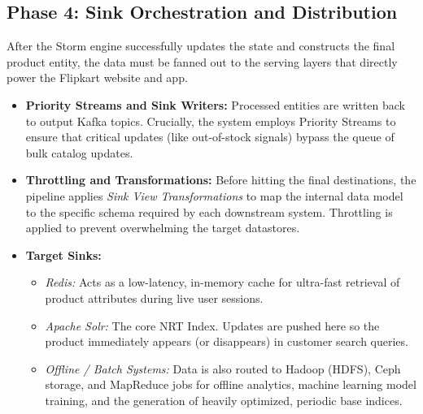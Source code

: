 \subsection{Phase 4: Sink Orchestration and Distribution}
\begin{justify}
    After the Storm engine successfully updates the state and constructs the final product entity, the data must be fanned out to the serving layers that directly power the Flipkart website and app.
    
    \begin{itemize}
        \item \textbf{Priority Streams and Sink Writers:} Processed entities are written back to output Kafka topics. Crucially, the system employs Priority Streams to ensure that critical updates (like out-of-stock signals) bypass the queue of bulk catalog updates.
        \item \textbf{Throttling and Transformations:} Before hitting the final destinations, the pipeline applies \textit{Sink View Transformations} to map the internal data model to the specific schema required by each downstream system. Throttling is applied to prevent overwhelming the target datastores.
        \item \textbf{Target Sinks:}
        \begin{itemize}
            \item \textit{Redis:} Acts as a low-latency, in-memory cache for ultra-fast retrieval of product attributes during live user sessions.
            \item \textit{Apache Solr:} The core NRT Index. Updates are pushed here so the product immediately appears (or disappears) in customer search queries.
            \item \textit{Offline / Batch Systems:} Data is also routed to Hadoop (HDFS), Ceph storage, and MapReduce jobs for offline analytics, machine learning model training, and the generation of heavily optimized, periodic base indices.
        \end{itemize}
    \end{itemize}
\end{justify}